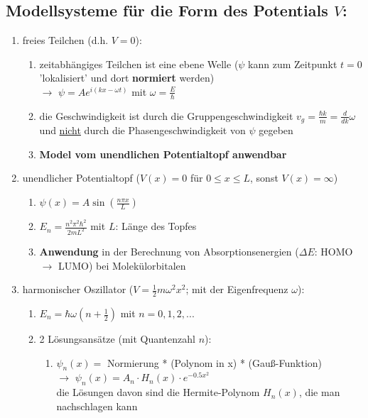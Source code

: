 \subsection{Modellsysteme für die Form des Potentials $V$:}
\begin{enumerate}
    \item freies Teilchen (d.h. $V=0$):
    \begin{enumerate}
        \item zeitabhängiges Teilchen ist eine ebene Welle ($\psi$ kann zum Zeitpunkt $t=0$ 'lokalisiert'  
        und dort \textbf{normiert} werden) \\
        $\rightarrow$ $\psi =Ae^{i(kx-\omega t)}$ mit $\omega=\frac{E}{\hbar}$
        \item die Geschwindigkeit ist durch die Gruppengeschwindigkeit $v_g=\frac{\hbar k}{m}=\frac{d}{dk}\omega$ und \underline{nicht}
        durch die Phasengeschwindigkeit von $\psi$ gegeben
        \item \textbf{Model vom unendlichen Potentialtopf anwendbar}
    \end{enumerate}
    \item unendlicher Potentialtopf ($V(x)=0$ für $0\leq x\leq L$, sonst $V(x)=\infty$)
        \begin{enumerate}
            \item $\psi(x)=A\sin(\frac{n\pi x}{L})$
            \item $E_n=\frac{n^2 \pi^2 \hbar^2}{2mL^2}$ mit $L$: Länge des Topfes 
            \item \textbf{Anwendung} in der Berechnung von Absorptionsenergien ($\Delta E$: HOMO $\rightarrow$ LUMO) bei Molekülorbitalen 
        \end{enumerate} 
    \item harmonischer Oszillator ($V=\frac{1}{2}m\omega^2x^2$; mit der Eigenfrequenz $\omega$):
    \begin{enumerate}
        \item $E_n=\hbar\omega(n+\frac{1}{2})$ mit $n=0,1,2,...$
        \item 2 Lösungsansätze (mit Quantenzahl $n$):
        \begin{enumerate}
            \item $\psi_n(x)=$ Normierung * (Polynom in x) * (Gauß-Funktion)\\
            $\rightarrow$ $\psi_n(x)=A_n\cdot H_n(x) \cdot e^{-0.5x^2}$ \\
            die Lösungen davon sind die Hermite-Polynom $H_n(x)$, die man nachschlagen kann

\end{enumerate}
\end{enumerate}
\end{enumerate}

